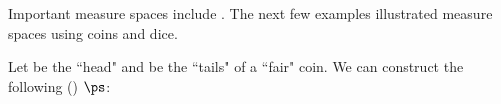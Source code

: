 

Important measure spaces include .
The next few examples illustrated measure spaces using 
coins and dice.
\begin{example}
\label{ex:msr_coin_flips}
Let \coinhead be the ``head" and \cointail be the ``tails" of a ``fair" coin.
We can construct the following  () $\ps$:
\end{example}


